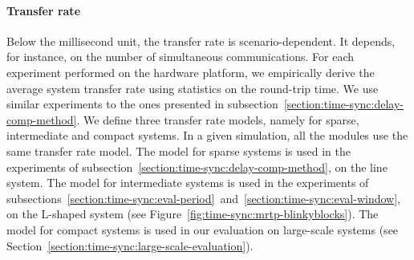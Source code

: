 \paragraph{Transfer rate}
Below the millisecond unit, the transfer rate is scenario-dependent. It depends, for instance, on the number of simultaneous communications. For each experiment performed on the hardware platform, we empirically derive the average system transfer rate using statistics on the round-trip time. We use similar experiments to the ones presented in subsection~\ref{section:time-sync:delay-comp-method}. We define three transfer rate models, namely for sparse, intermediate and compact systems. In a given simulation, all the modules use the same transfer rate model. The model for sparse systems is used in the experiments of subsection~\ref{section:time-sync:delay-comp-method}, on the line system. The model for intermediate systems is used in the experiments of subsections~\ref{section:time-sync:eval-period}~and~\ref{section:time-sync:eval-window}, on the L-shaped system (see Figure~\ref{fig:time-sync:mrtp-blinkyblocks}). The model for compact systems is used in our evaluation on large-scale systems (see Section~\ref{section:time-sync:large-scale-evaluation}).

